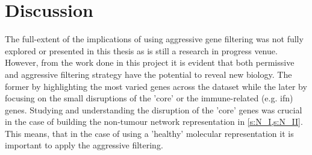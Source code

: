 \chapter{Discussion} \label{s:discussion}


The full-extent of the implications of using aggressive gene filtering was not fully explored or presented in this thesis as is still a research in progress venue. However, from the work done in this project it is evident that both permissive and aggressive filtering strategy have the potential to reveal new biology. The former by highlighting the most varied genes across the dataset while the later by focusing on the small disruptions of the 'core' or the immune-related (e.g. \acrlong{ifn}) genes. Studying and understanding the disruption of the 'core' genes was crucial in the case of building the non-tumour network representation in \cref{s:N_I,s:N_II}. This means, that in the case of using a 'healthy' molecular representation it is important to apply the aggressive filtering.
